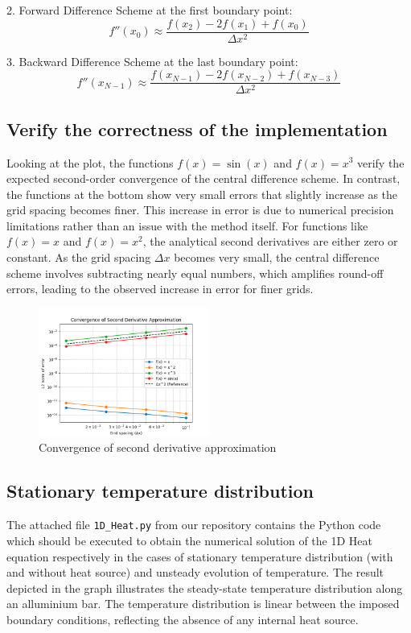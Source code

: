 \documentclass{article}
\begin{document}
2. Forward Difference Scheme at the first boundary point:
\[
f''(x_0) \approx \frac{f(x_2) - 2f(x_1) + f(x_0)}{\Delta x^2}
\]

3. Backward Difference Scheme at the last boundary point:
\[
f''(x_{N-1}) \approx \frac{f(x_{N-1}) - 2f(x_{N-2}) + f(x_{N-3})}{\Delta x^2}
\]

\subsection{Verify the correctness of the implementation}

Looking at the plot, the functions \( f(x) = \sin(x) \) and \( f(x) = x^3 \) verify the expected second-order convergence of the central 
difference scheme. In contrast, the functions at the bottom show very small errors that slightly increase as the grid spacing becomes finer.
This increase in error is due to numerical precision limitations rather than an issue with the method itself. For functions like \( f(x) = x \) 
and \( f(x) = x^2 \), the analytical second derivatives are either zero or constant. As the grid spacing \( \Delta x \) becomes very small,
 the central difference scheme involves subtracting nearly equal numbers, which amplifies round-off errors, leading to the observed increase
in error for finer grids.


\begin{figure}[h!]
  \centering
  \includegraphics[width=0.5\textwidth]{Figure_4.png}
  \caption{Convergence of second derivative approximation}
  \label{fig: Convergence of second derivative approximation}
\end{figure}

\subsection{Stationary temperature distribution}

The attached file \texttt{1D\_Heat.py} from our repository \cite{GitHubRepo} contains the Python code which should be executed to obtain 
the numerical solution of the 1D Heat equation respectively in the cases of stationary temperature distribution (with and without heat source) 
and unsteady evolution of temperature. The result depicted in the graph illustrates the steady-state temperature distribution along an alluminium
bar. The temperature distribution is linear between the imposed boundary conditions, reflecting the absence of any internal heat source.
\end{document}

